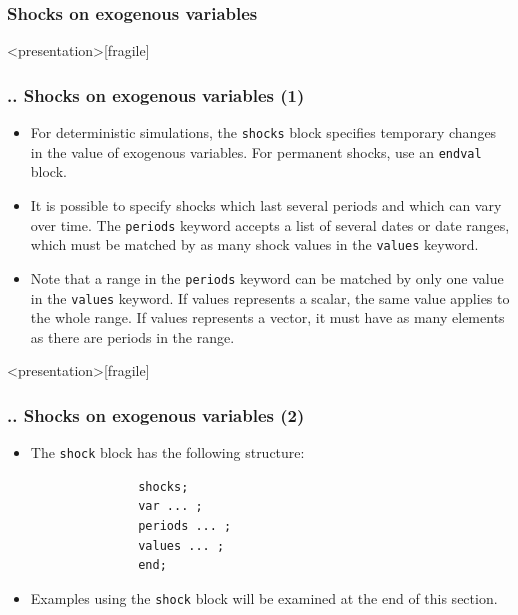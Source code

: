 \documentclass[11pt,aspectratio=169]{beamer}
\begin{document}
\subsubsection{Shocks on exogenous variables}
\begin{frame}<presentation>[fragile]
	\frametitle{{\thesection.\thesubsection.\thesubsubsection} Shocks on exogenous variables (1)}
	\begin{itemize}
		\item For deterministic simulations, the \texttt{shocks} block specifies temporary changes in the value of exogenous variables. For permanent shocks, use an \texttt{endval} block.
		\item It is possible to specify shocks which last several periods and which can vary over time.  The \texttt{periods} keyword accepts a list of several dates or date ranges, which must be matched by as many shock values in the \texttt{values} keyword. 
		\item Note that a range in the \texttt{periods} keyword can be matched by only one value in the \texttt{values} keyword.  If values represents a scalar, the same value applies to the whole range.  If values represents a vector, it must have as many elements as there are periods in the range.
	\end{itemize}
\end{frame}
\begin{frame}<presentation>[fragile]
	\frametitle{{\thesection.\thesubsection.\thesubsubsection} Shocks on exogenous variables (2)}
	\begin{itemize}
		\item The \texttt{shock} block has the following structure:
			\begin{verbatim}
			   shocks;
			   var ... ;
			   periods ... ;
			   values ... ;
			   end;
			\end{verbatim}
		\item Examples using the \texttt{shock} block will be examined at the end of this section.
	\end{itemize}
\end{frame}
\end{document}
